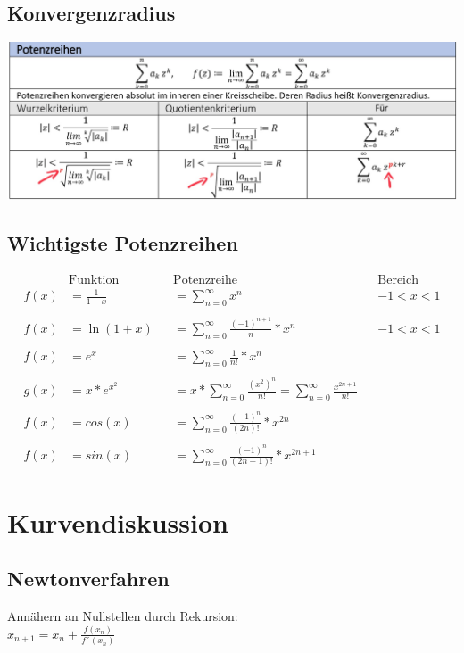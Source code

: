\documentclass[12pt,a4paper]{article}
\begin{document}
	\subsection{Konvergenzradius}
		\includegraphics[scale=0.3]{Bilder/Konvergenzradius.jpg}

	\subsection{Wichtigste Potenzreihen}
		$$
		\begin{aligned}
		&\text{Funktion }&& \text{Potenzreihe }&& \text{Bereich} \\
		f(x)&= \frac{1}{1-x}&& =\sum^{\infty}_{n=0}x^{n} && -1 <x <1\\\\
		f(x)&= \ln{(1+x)}&&=\sum^{\infty}_{n=0} \frac{(-1)^{n+1}}{n}*x^{n} && -1 <x <1\\\\
		f(x)&=e^{x} &&= \sum^{\infty}_{n=0}{\frac{1}{n!}}*x^{n}\\\\
		g(x)&=x*e^{x^{2}}&&=x*\sum^{\infty}_{n=0} \frac{{(x^{2})^{n}}}{n!} = \sum^{\infty}_{n=0} \frac{x^{2n+1}}{n!}\\\\
		f(x)&=cos(x) &&= \sum^{\infty}_{n=0}{ \frac{(-1)^{n}}{(2n)!}*x^{2n}}\\\\
		f(x)&=sin(x) &&= \sum^{\infty}_{n=0}{ \frac{(-1)^{n}}{(2n+1)!}*x^{2n+1}}
		\end{aligned}
		$$

\section{Kurvendiskussion}
	\subsection{Newtonverfahren}
		Annähern an Nullstellen durch Rekursion:\\
		$x_{n+1} = x_n + \frac{f(x_n)}{f´(x_n)}$
		
\end{document}
